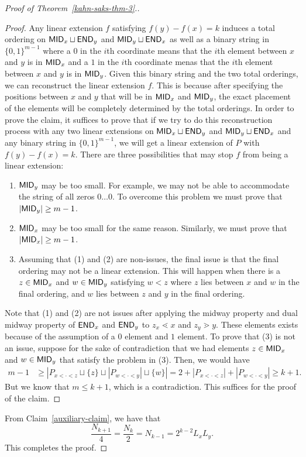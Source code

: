 \documentclass{puthesis-UG}
\begin{document}
\begin{proof}[Proof of Theorem~\ref{kahn-saks-thm-3}.]
	\begin{proof}
		Any linear extension $f$ satisfying $f(y) - f(x) = k$ induces a total ordering on $\mathsf{MID}_x \sqcup \mathsf{END}_y$ and $\mathsf{MID}_y \sqcup \mathsf{END}_x$ as well as a binary string in $\{0, 1\}^{m-1}$ where a $0$ in the $i$th coordinate means that the $i$th element between $x$ and $y$ is in $\mathsf{MID}_x$ and a $1$ in the $i$th coordinate menas that the $i$th element between $x$ and $y$ is in $\mathsf{MID}_y$. Given this binary string and the two total orderings, we can reconstruct the linear extension $f$. This is because after specifying the positions between $x$ and $y$ that will be in $\mathsf{MID}_x$ and $\mathsf{MID}_y$, the exact placement of the elements will be completely determined by the total orderings. In order to prove the claim, it suffices to prove that if we try to do this reconstruction process with any two linear extensions on $\mathsf{MID}_x \sqcup \mathsf{END}_y$ and $\mathsf{MID}_y \sqcup \mathsf{END}_x$ and any binary string in $\{0, 1\}^{m-1}$, we will get a linear extension of $P$ with $f(y) - f(x) = k$. There are three possibilities that may stop $f$ from being a linear extension: 
		\begin{enumerate}[label = (\arabic*)]
			\item $\mathsf{MID}_y$ may be too small. For example, we may not be able to accommodate the string of all zeros $0 \ldots 0$. To overcome this problem we must prove that $|\mathsf{MID}_y| \geq m-1$. 
			\item $\mathsf{MID}_x$ may be too small for the same reason. Similarly, we must prove that $|\mathsf{MID}_x| \geq m-1$. 
			\item Assuming that (1) and (2) are non-issues, the final issue is that the final ordering may not be a linear extension. This will happen when there is a $z \in \mathsf{MID}_x$ and $w \in \mathsf{MID}_y$ satisfying $w < z$ where $z$ lies between $x$ and $w$ in the final ordering, and $w$ lies between $z$ and $y$ in the final ordering.
		\end{enumerate}
		Note that (1) and (2) are not issues after applying the midway property and dual midway property of $\mathsf{END}_x$ and $\mathsf{END}_y$ to $z_x \lessdot x$ and $z_y \gtrdot y$. These elements exists because of the assumption of a $0$ element and $1$ element. To prove that (3) is not an issue, suppose for the sake of contradiction that we had elements $z \in \mathsf{MID}_x$ and $w \in \mathsf{MID}_y$ that satisfy the problem in (3). Then, we would have 
		\begin{align*}
			m-1 & \geq \left | P_{x < \cdot < z} \sqcup \{z\} \sqcup |P_{w < \cdot < y}| \sqcup \{w\} \right | = 2 + |P_{x < \cdot < z}| + |P_{w < \cdot < y}| \geq k+1.
		\end{align*}
		But we know that $m \leq k+1$, which is a contradiction. This suffices for the proof of the claim. 
	\end{proof}
	From Claim~\ref{auxiliary-claim}, we have that 
	\[
		\frac{N_{k+1}}{4} = \frac{N_{k}}{2} = N_{k-1} = 2^{k-2} L_x L_y. 
	\]
	This completes the proof.
\end{proof}
\end{document}
